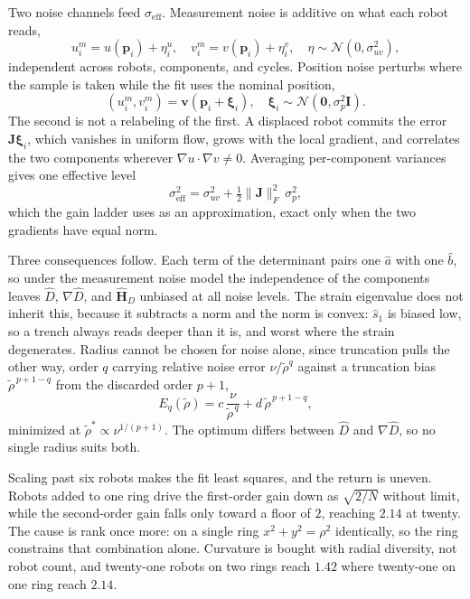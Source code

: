 \documentclass[lettersize,journal]{IEEEtran}
\begin{document}
Two noise channels feed $\sigma_{\mathrm{eff}}$. Measurement noise is
additive on what each robot reads,
\begin{equation}
    u_i^m = u(\mathbf{p}_i) + \eta_i^u, \quad
    v_i^m = v(\mathbf{p}_i) + \eta_i^v,
    \quad \eta \sim \mathcal{N}(0, \sigma_{uv}^2),
\end{equation}
independent across robots, components, and cycles. Position noise
perturbs where the sample is taken while the fit uses the nominal
position,
\begin{equation}
    (u_i^m, v_i^m) = \mathbf{v}(\mathbf{p}_i + \boldsymbol{\xi}_i), \quad
    \boldsymbol{\xi}_i \sim \mathcal{N}(\mathbf{0}, \sigma_p^2 \mathbf{I}).
\end{equation}
The second is not a relabeling of the first. A displaced robot commits
the error $\mathbf{J}\boldsymbol{\xi}_i$, which vanishes in uniform
flow, grows with the local gradient, and correlates the two components
wherever $\nabla u \cdot \nabla v \neq 0$. Averaging per-component
variances gives one effective level
\begin{equation}
    \sigma_{\mathrm{eff}}^2 = \sigma_{uv}^2
        + \tfrac{1}{2}\lVert\mathbf{J}\rVert_F^2\,\sigma_p^2 ,
    \label{eq:sigma_eff}
\end{equation}
which the gain ladder uses as an approximation, exact only when the two
gradients have equal norm.

Three consequences follow. Each term of the determinant pairs one
$\hat{a}$ with one $\hat{b}$, so under the measurement noise model the
independence of the components leaves $\hat{D}$, $\nabla\hat{D}$, and
$\hat{\mathbf{H}}_D$ unbiased at all noise levels. The strain
eigenvalue does not inherit this, because it subtracts a norm and the
norm is convex: $\hat{s}_1$ is biased low, so a trench always reads
deeper than it is, and worst where the strain degenerates. Radius cannot
be chosen for noise alone, since truncation pulls the other way, order
$q$ carrying relative noise error $\nu/\tilde{\rho}^q$ against a
truncation bias $\tilde{\rho}^{\,p+1-q}$ from the discarded order
$p+1$,
\begin{equation}
    E_q(\tilde{\rho}) = c\,\frac{\nu}{\tilde{\rho}^{\,q}}
        + d\,\tilde{\rho}^{\,p+1-q},
\end{equation}
minimized at $\tilde{\rho}^* \propto \nu^{1/(p+1)}$. The optimum differs
between $\hat{D}$ and $\nabla\hat{D}$, so no single radius suits both.

Scaling past six robots makes the fit least squares, and the return is
uneven. Robots added to one ring drive the first-order gain down as
$\sqrt{2/N}$ without limit, while the second-order gain falls only
toward a floor of $2$, reaching $2.14$ at twenty. The cause is rank once
more: on a single ring $x^2 + y^2 = \rho^2$ identically, so the ring
constrains that combination alone. Curvature is bought with radial
diversity, not robot count, and twenty-one robots on two rings
reach $1.42$ where twenty-one on one ring reach $2.14$.
\end{document}
